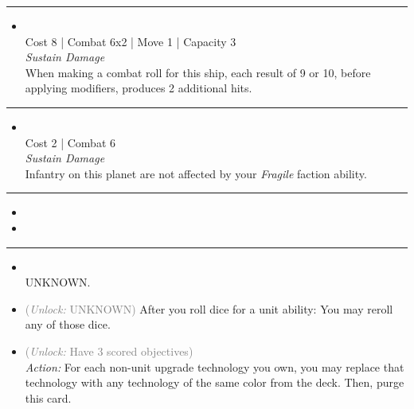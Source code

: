 \begin{multicols}{2}
\vspace{-10pt}\rule{\hsize}{0.4pt}\vspace{5pt}


\begin{itemize}
\item {}\\
Cost 8 | Combat 6x2 | Move 1 | Capacity 3 \\
\emph{Sustain Damage}\\
When making a combat roll for this ship, each result of 9 or 10, before applying modifiers, produces 2 additional hits.
\end{itemize}

\vspace{-10pt}\rule{\hsize}{0.4pt}\vspace{5pt}


\begin{itemize}
\item {}
\\
Cost 2 | Combat 6\\
\emph{Sustain Damage}\\
Infantry on this planet are not affected by your \emph{Fragile} faction ability.
\end{itemize}

\vspace{-10pt}\rule{\hsize}{0.4pt}\vspace{5pt}

\nounits

\columnbreak
{}

\begin{itemize}
\item \cylinder
\item \eres
\end{itemize}

\vspace{-10pt}\rule{\hsize}{0.4pt}\vspace{5pt}


\begin{itemize}
\item {}\\
UNKNOWN.
\item {} \textcolor{gray}{(\emph{Unlock:} UNKNOWN)}
After you roll dice for a unit ability: You may reroll any of those dice.
\item {} \textcolor{gray}{(\emph{Unlock:} Have 3 scored objectives)}\\
\emph{Action:} For each non-unit upgrade technology you own, you may replace that technology with any technology of the same color from the deck. Then, purge this card. 
\end{itemize}


\end{multicols}
